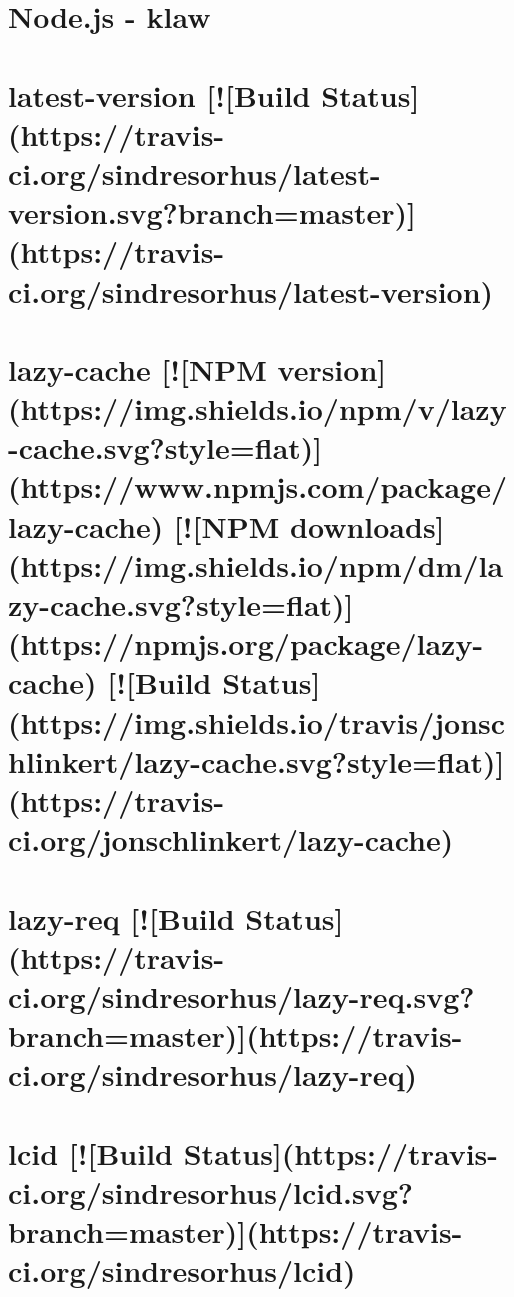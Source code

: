 \documentclass[twoside]{book}
\newcommand{\+}{\discretionary{\mbox{\scriptsize$\hookleftarrow$}}{}{}}
\begin{document}
\chapter{Node.\+js -\/ klaw}
\label{md__c_1_workspace_demo_src_main_script_node_modules_klaw__r_e_a_d_m_e}

\chapter{latest-\/version \mbox{[}!\mbox{[}Build Status\mbox{]}(https\+://travis-\/ci.org/sindresorhus/latest-\/version.svg?branch=master)\mbox{]}(https\+://travis-\/ci.org/sindresorhus/latest-\/version)}
\label{md__c_1_workspace_demo_src_main_script_node_modules_latest-version_readme}

\chapter{lazy-\/cache \mbox{[}!\mbox{[}N\+PM version\mbox{]}(https\+://img.shields.\+io/npm/v/lazy-\/cache.svg?style=flat)\mbox{]}(https\+://www.npmjs.\+com/package/lazy-\/cache) \mbox{[}!\mbox{[}N\+PM downloads\mbox{]}(https\+://img.shields.\+io/npm/dm/lazy-\/cache.svg?style=flat)\mbox{]}(https\+://npmjs.org/package/lazy-\/cache) \mbox{[}!\mbox{[}Build Status\mbox{]}(https\+://img.shields.\+io/travis/jonschlinkert/lazy-\/cache.svg?style=flat)\mbox{]}(https\+://travis-\/ci.org/jonschlinkert/lazy-\/cache)}
\label{md__c_1_workspace_demo_src_main_script_node_modules_lazy-cache__r_e_a_d_m_e}

\chapter{lazy-\/req \mbox{[}!\mbox{[}Build Status\mbox{]}(https\+://travis-\/ci.org/sindresorhus/lazy-\/req.svg?branch=master)\mbox{]}(https\+://travis-\/ci.org/sindresorhus/lazy-\/req)}
\label{md__c_1_workspace_demo_src_main_script_node_modules_lazy-req_readme}

\chapter{lcid \mbox{[}!\mbox{[}Build Status\mbox{]}(https\+://travis-\/ci.org/sindresorhus/lcid.svg?branch=master)\mbox{]}(https\+://travis-\/ci.org/sindresorhus/lcid)}
\label{md__c_1_workspace_demo_src_main_script_node_modules_lcid_readme}

\end{document}
